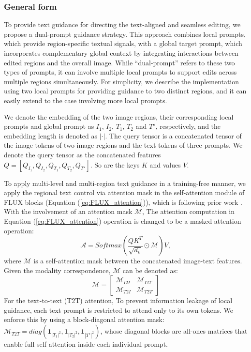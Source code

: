 \documentclass{article}
\begin{document}
\subsubsection{General form}
To provide text guidance for directing the text-aligned and seamless editing, we propose a dual-prompt guidance strategy. This approach combines local prompts, which provide region-specific textual signals, with a global target prompt, which incorporates complementary global context by integrating interactions between edited regions and the overall image. While ``dual-prompt'' refers to these two types of prompts, it can involve multiple local prompts to support edits across multiple regions simultaneously. For simplicity, we describe the implementation using two local prompts for providing guidance to two distinct regions, and it can easily extend to the case involving more local prompts.

We denote the embedding of the two image regions, their corresponding local prompts and global prompt  as $I_1$,  $I_2$,  $T_1$, $T_2$ and $T^\star$, respectively, and the embedding length is denoted as $|\cdot|$. The query tensor is a concatenated tensor of the image tokens of two image regions and the text tokens of three prompts. We denote the query tensor as the concatenated features $ Q= [Q_{I_1}, Q_{I_2}, Q_{T_1}, Q_{T_2}, Q_{T^{\star}}]$. So are the keys $K$ and values $V$. 

To apply multi-level and multi-region text guidance in a training-free manner, we apply the regional text control via attention mask in  the self-attention module of FLUX blocks (Equation (\ref{eq:FLUX_attention})), which is following prior work \citep{chen2024training}. With the involvement of an attention mask $\mathcal{M}$, The attention computation in Equation (\ref{eq:FLUX_attention}) operation is changed to be a masked attention operation:
\begin{equation*}
\mathcal{A} = Softmax(\frac{QK^T}{\sqrt{d_k}} \odot \mathcal{M})V,
\label{eq:masked_attention}
\end{equation*}
where $\mathcal{M}$ is a self-attention mask between the concatenated image-text features. Given the modality correspondence, $ \mathcal{M}$ can be denoted as:
\begin{equation*}
    \mathcal{M} = \begin{bmatrix}
        \mathcal{M}_{I2I} &  \mathcal{M}_{I2T} \\
        \mathcal{M}_{T2I} &  \mathcal{M}_{T2T}
    \end{bmatrix}
\end{equation*}
For the text-to-text (T2T) attention, To prevent information leakage of local guidance, each text prompt is restricted to attend only to its own tokens. We enforce this by using a block-diagonal attention mask: $\mathcal{M}_{T2T}=diag(\mathbf{1}_{|T_1|^2}, \mathbf{1}_{|T_2|^2},\mathbf{1}_{|T^\star|^2})$, whose diagonal blocks are all-ones matrices that enable full self-attention inside each individual prompt. %
\end{document}
